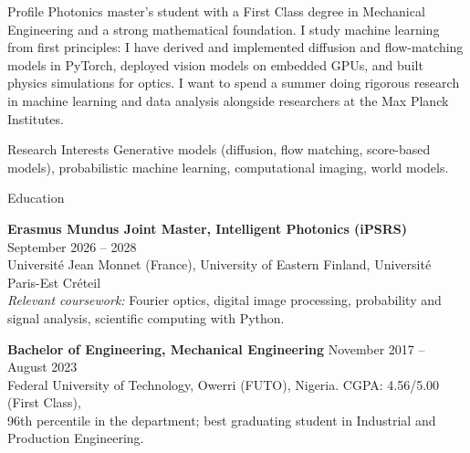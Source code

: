 \documentclass{resume}
\begin{document}
\begin{rSection}{Profile}
Photonics master's student with a First Class degree in Mechanical Engineering and a strong
mathematical foundation. I study machine learning from first principles: I have derived and
implemented diffusion and flow-matching models in PyTorch, deployed vision models on embedded
GPUs, and built physics simulations for optics. I want to spend a summer doing rigorous research
in machine learning and data analysis alongside researchers at the Max Planck Institutes.
\end{rSection}

\begin{rSection}{Research Interests}
Generative models (diffusion, flow matching, score-based models), probabilistic machine learning,
computational imaging, world models.
\end{rSection}

\begin{rSection}{Education}

{\bf Erasmus Mundus Joint Master, Intelligent Photonics (iPSRS)} \hfill {September 2026 -- 2028}\\
Université Jean Monnet (France), University of Eastern Finland, Université Paris-Est Créteil\\
\textit{Relevant coursework:} Fourier optics, digital image processing, probability and signal analysis,
scientific computing with Python.

{\bf Bachelor of Engineering, Mechanical Engineering} \hfill {November 2017 -- August 2023}\\
Federal University of Technology, Owerri (FUTO), Nigeria. CGPA: 4.56/5.00 (First Class),\\
96th percentile in the department; best graduating student in Industrial and Production Engineering.

\end{rSection}
\end{document}
